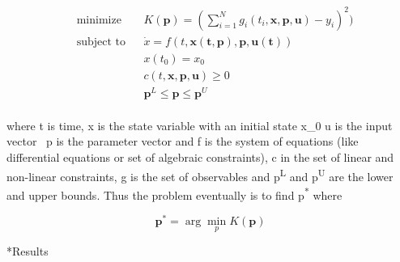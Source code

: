 \documentclass[12pt]{article}
\makeatletter
\renewcommand\section{\@startsection
	{subsection}{2}{0mm}
	{-0.2in}
	{0.05\baselineskip}
	{\normalfont\large\bfseries}}
\makeatother
\begin{document}
\begin{equation}\label{eq:static_opt}
\begin{aligned}
& \text{minimize}
& & K(\mathbf{p})=(\sum_{i=1}^N g_i(t_i,\mathbf{x,p,u})-y_i)^2) \\
& \text{subject to}
&&\dot{x}=f(t,\mathbf{x(t,\mathbf{p}),p,u(\mathbf{t})})\\
&&&x(t_0) = x_0\\
&&&c(t,\mathbf{x,p,u}) \geqslant 0 \\
&&& \mathbf{p}^L \leqslant \mathbf{p} \leqslant \mathbf{p}^U\\
\end{aligned}
\end{equation}

where t is time, x is the state variable with an initial state x\_0 u is the input vector \, p is the parameter vector and f is the system of equations (like differential equations or set of algebraic constraints), c in the set of linear and non-linear constraints, g is the set of observables and p\textsuperscript{L} and p\textsuperscript{U} are the lower and upper bounds. Thus the problem eventually is to find {p}\textsuperscript{*} where 

\begin{equation}\label{eq:static_opt_2}
\mathbf{p^{*}}= \arg\min_{p} K(\mathbf{p})
\end{equation}

\section*{Results}
\end{document}
